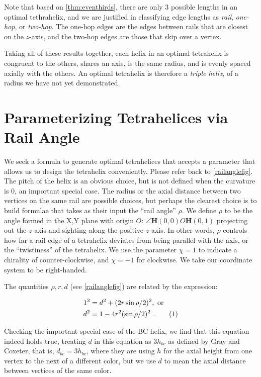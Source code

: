 \documentclass[twocolumn,10pt]{asme2ej}
\newcommand\numberthis{\addtocounter{equation}{1}\tag{\theequation}}
\renewcommand{\vec}[1]{\mathbf{#1}}
\begin{document}
 Note that based on \cref{thm:eventhirds}, there are only 3 possible lengths in an optimal tethrahelix,
 and we are justified in classifying edge lengths as \emph{rail}, \emph{one-hop}, or
\emph{two-hop}. The one-hop edges are the edges between rails that are closest on the $z$-axis, and the two-hop edges are those that skip over a vertex.


Taking all of these results together, 
each helix in an optimal tetrahelix is congruent to the others, shares an axis, is the same radius, and is evenly spaced
axially with the others.
An optimal tetrahelix is therefore a \emph{triple helix}, of a radius we have not yet demonstrated.

\section{Parameterizing Tetrahelices via Rail Angle}
\label{sec:parameterizing}

We seek a formula to generate optimal tetrahelices that accepts a
parameter that allows us to design the tetrahelix conveniently.
Please refer back to \cref{railanglefig}.
The pitch of the helix is an obvious choice, but is not defined when the
curvature is $0$, an important special case. The radius or the axial
distance between two vertices on the same rail are possible choices, but
perhaps the clearest choice is to build formulae that takes as their
input the ``rail angle'' $\rho$. We define $\rho$ to be the angle
formed in the X,Y plane with origin $O$: $\angle \vec{H}(0,0) O \vec{H}(0,1)$ projecting out the
$z$-axis and sighting along the positive $z$-axis. In other words, $\rho$
controls how far a rail edge of a tetrahelix deviates from being
parallel with the axis, or the ``twistiness'' of the tetrahelix. We use
the parameter $\chi = 1$ to indicate a chirality of counter-clockwise,
and $\chi = -1$ for clockwise. We take our coordinate system to be right-handed.

The quantities $\rho,r,d$ (see \cref{railanglefig}) are related by the expression:

\begin{align*}
  1^2 &= d^2 + (2 r \sin{ \rho / 2})^2 , \text{ or }\\
  d^2 &= 1 - 4 r^2 (\sin{ \rho / 2})^2  \text{ .}  \numberthis  \label{railangle} \\
\end{align*}

Checking the important special case of the BC helix, we find that this equation
indeed holds true, treating $d$ in this equation as $3 h_{bc}$ as defined by
Gray and Coxeter, that is, $d_{bc} = 3h_{bc}$, where they are using
$h$ for the axial height from one vertex to
the next of a different color, but we use $d$ to mean the axial distance between vertices of
the  same color.
\end{document}
